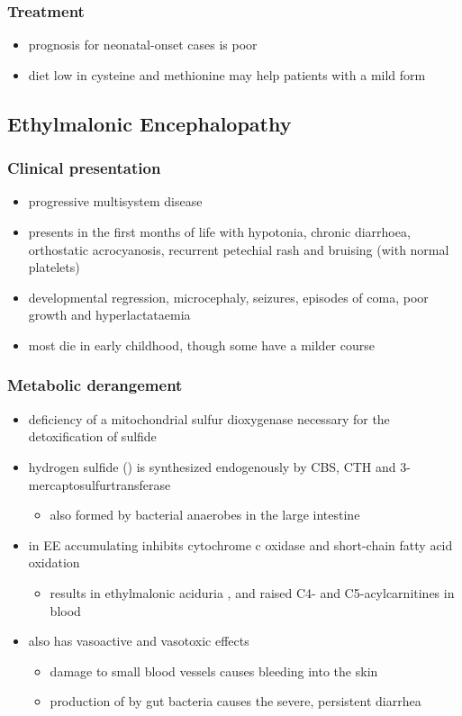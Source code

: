 \documentclass{scrartcl}
\begin{document}
\subsubsection{Treatment}
\label{sec:orgd97c90f}
\begin{itemize}
\item prognosis for neonatal-onset cases is poor
\item diet low in cysteine and methionine may help patients with a mild
form
\end{itemize}

\subsection{Ethylmalonic Encephalopathy}
\label{sec:orgd912dc9}
\subsubsection{Clinical presentation}
\label{sec:org20944a6}
\begin{itemize}
\item progressive multisystem disease
\item presents in the first months of life with hypotonia, chronic
diarrhoea, orthostatic acrocyanosis, recurrent petechial rash and
bruising (with normal platelets)
\item developmental regression, microcephaly, seizures, episodes of coma,
poor growth and hyperlactataemia
\item most die in early childhood, though some have a milder course
\end{itemize}

\subsubsection{Metabolic derangement}
\label{sec:orga95d22f}
\begin{itemize}
\item deficiency of a mitochondrial sulfur dioxygenase necessary for the
detoxification of sulfide
\item hydrogen sulfide () is synthesized endogenously by CBS, CTH
and 3-mercaptosulfurtransferase
\begin{itemize}
\item also formed by bacterial anaerobes in the large intestine
\end{itemize}
\item in EE accumulating  inhibits cytochrome c oxidase and
short-chain fatty acid oxidation
\begin{itemize}
\item results in ethylmalonic aciduria , and raised C4- and C5-acylcarnitines in blood
\end{itemize}
\item {} also has vasoactive and vasotoxic effects
\begin{itemize}
\item damage to small blood vessels causes bleeding into the
skin
\item production of  by gut bacteria causes the severe, persistent diarrhea
\end{itemize}
\end{itemize}
\end{document}
